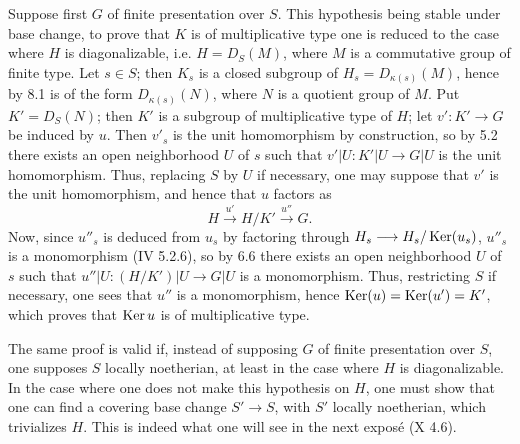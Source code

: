 Suppose first $G$ of finite presentation over $S$. This hypothesis being stable under base change, to prove that $K$ is of multiplicative type one is reduced to the case where $H$ is diagonalizable, i.e. $H=D_S(M)$, where $M$ is a commutative group of finite type. Let $s\in S$; then $K_s$ is a closed subgroup of $H_s=D_{\kappa(s)}(M)$, hence by 8.1 is of the form $D_{\kappa(s)}(N)$, where $N$ is a quotient group of $M$. Put $K'=D_S(N)$; then $K'$ is a subgroup of multiplicative type of $H$; let $v':K'\to G$ be induced by $u$. Then $v'_s$ is the unit homomorphism by construction, so by 5.2 there exists an open neighborhood $U$ of $s$ such that $v'|U:K'|U\to G|U$ is the unit homomorphism. Thus, replacing $S$ by $U$ if necessary, one may suppose that $v'$ is the unit homomorphism, and hence that $u$ factors as
\[
H\xrightarrow{u'}H/K'\xrightarrow{u''}G.
\]
Now, since $u''_s$ is deduced from $u_s$ by factoring through $H_s\longrightarrow H_s/\operatorname{Ker}(u_s)$, $u''_s$ is a monomorphism (IV 5.2.6), so by 6.6 there exists an open neighborhood $U$ of $s$ such that $u''|U:(H/K')|U\to G|U$ is a monomorphism. Thus, restricting $S$ if necessary, one sees that $u''$ is a monomorphism, hence $\operatorname{Ker}(u)=\operatorname{Ker}(u')=K'$, which proves that $\operatorname{Ker} u$ is of multiplicative type.

The same proof is valid if, instead of supposing $G$ of finite presentation over $S$, one supposes $S$ locally noetherian, at least in the case where $H$ is diagonalizable. In the case where one does not make this hypothesis on $H$, one must show that one can find a covering base change $S'\to S$, with $S'$ locally noetherian, which trivializes $H$. This is indeed what one will see in the next expos\'e (X 4.6).

